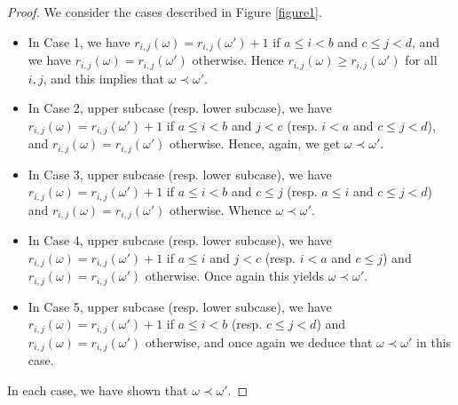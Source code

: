 \begin{proof}
We consider the cases described in Figure \ref{figure1}.
\begin{itemize}
\item
In Case 1, we have $r_{i,j}(\omega)=r_{i,j}(\omega')+1$ if $a\leq i<b$ and $c\leq j<d$, and we have $r_{i,j}(\omega)=r_{i,j}(\omega')$ otherwise.
Hence $r_{i,j}(\omega)\geq r_{i,j}(\omega')$ for all $i,j$, and this implies that $\omega\prec\omega'$.
\item In Case 2, upper subcase (resp. lower subcase), we have $r_{i,j}(\omega)=r_{i,j}(\omega')+1$ if $a\leq i<b$ and $j<c$ (resp. $i<a$ and $c\leq j<d$), and $r_{i,j}(\omega)=r_{i,j}(\omega')$ otherwise. Hence, again, we get $\omega\prec\omega'$.
\item In Case 3, upper subcase (resp. lower subcase), we have $r_{i,j}(\omega)=r_{i,j}(\omega')+1$ if $a\leq i<b$ and $c\leq j$ (resp. $a\leq i$ and $c\leq j<d$) and $r_{i,j}(\omega)=r_{i,j}(\omega')$ otherwise. Whence $\omega\prec\omega'$.
\item In Case 4, upper subcase (resp. lower subcase), we have $r_{i,j}(\omega)=r_{i,j}(\omega')+1$ if $a\leq i$ and $j<c$ (resp. $i<a$ and $c\leq j$) and $r_{i,j}(\omega)=r_{i,j}(\omega')$ otherwise. Once again this yields $\omega\prec\omega'$.
\item In Case 5, upper subcase (resp. lower subcase), we have $r_{i,j}(\omega)=r_{i,j}(\omega')+1$ if $a\leq i<b$ (resp. $c\leq j<d$) and $r_{i,j}(\omega)=r_{i,j}(\omega')$ otherwise, and once again we deduce that $\omega\prec\omega'$ in this case.
\end{itemize}
In each case, we have shown that $\omega\prec\omega'$.


\end{proof}
